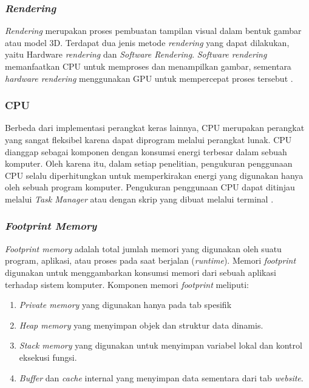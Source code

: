 \subsubsection{\textit{Rendering}}
\textit{Rendering} merupakan proses pembuatan tampilan visual dalam bentuk gambar atau model 3D. Terdapat dua jenis metode \textit{rendering} yang dapat dilakukan, yaitu Hardware \textit{rendering} dan \textit{Software Rendering}. \textit{Software rendering} memanfaatkan CPU untuk memproses dan menampilkan gambar, sementara \textit{hardware rendering} menggunakan GPU untuk mempercepat proses tersebut \cite{Paradis2016}.

\subsubsection{CPU}
Berbeda dari implementasi perangkat keras lainnya, CPU merupakan perangkat yang sangat fleksibel karena dapat diprogram melalui perangkat lunak. CPU dianggap sebagai komponen dengan konsumsi energi terbesar dalam sebuah komputer. Oleh karena itu, dalam setiap penelitian, pengukuran penggunaan CPU selalu diperhitungkan untuk memperkirakan energi yang digunakan hanya oleh sebuah program komputer. Pengukuran penggunaan CPU dapat ditinjau melalui \textit{Task Manager} atau dengan skrip yang dibuat melalui terminal \cite{8566475}.

\subsubsection{\textit{Footprint Memory}}
\textit{Footprint memory} adalah total jumlah memori yang digunakan oleh suatu program, aplikasi, atau proses pada saat berjalan (\textit{runtime}). Memori \textit{footprint} digunakan untuk menggambarkan konsumsi memori dari sebuah aplikasi terhadap sistem komputer. Komponen memori \textit{footprint} meliputi:
\begin{enumerate}
	\item \textit{Private memory} yang digunakan hanya pada tab spesifik 
	\item \textit{Heap memory} yang menyimpan objek dan struktur data dinamis.
	\item \textit{Stack memory} yang digunakan untuk menyimpan variabel lokal dan kontrol eksekusi fungsi.
	\item \textit{Buffer} dan \textit{cache} internal yang menyimpan data sementara dari tab \textit{website}.
\end{enumerate}

